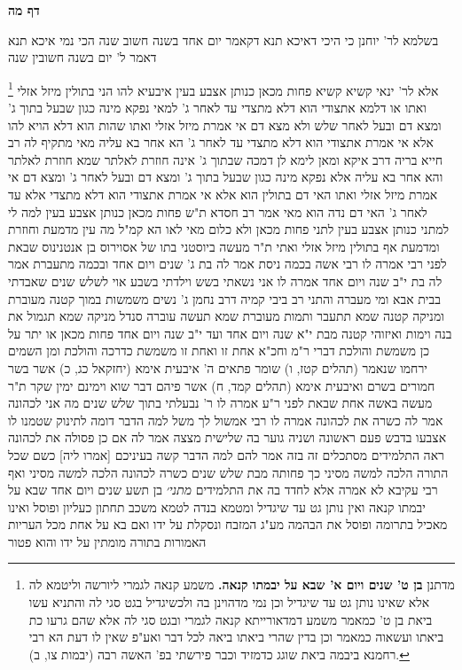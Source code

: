 \documentclass[12pt, openany]{book}
\newcommand{\sethebfont}{
\fontsize{10.5pt}{21.0pt} \selectfont
}
\newcommand{\twocol}[1]{
	{\sethebfont \begin{multicols}{2}
			#1
	\end{multicols}}	
}
\newcommand{\sectname}{}
\newcommand{\newsection}[1]{
	\addcontentsline{toc}{section}{#1}
	\renewcommand{\sectname}{#1}	
	\vspace{-\baselineskip}
	\begin{center}
		\textbf{%
\fontsize{16pt}{16pt}\selectfont
			#1}
	\end{center}
	\vspace{-\baselineskip}
	\nopagebreak
}
\newcommand{\footnotecomment}[1]{
	\renewcommand\thefootnote{}
	\footnote{#1}}
\newcommand{\commenta}[1]{\footnotecomment{#1}}
\begin{document}
\newsection{דף מה}
\twocol{בשלמא לר' יוחנן כי היכי דאיכא תנא דקאמר יום אחד בשנה חשוב שנה הכי נמי איכא תנא דאמר ל' יום בשנה חשובין שנה 
\commenta{מדתנן \textbf{בן ט' שנים ויום א' שבא על יבמתו קנאה.} משמע קנאה לגמרי ליורשה וליטמא לה אלא שאינו נותן גט עד שיגדיל וכן נמי מדהוינן בה ולכשיגדיל בגט סגי לה והתניא עשו ביאת בן ט' כמאמר משמע דמדאורייתא קנאה לגמרי ובגט סגי לה אלא שהם גרעו כת ביאתו ועשאוה כמאמר וכן בדין שהרי ביאתו ביאה לכל דבר ואע"פ שאין לו דעת הא רבי רחמנא ביבמה ביאת שוגג כדמזיד וכבר פירשתי בפ' האשה רבה (יבמות צו, ב). }
אלא לר' ינאי קשיא קשיא
פחות מכאן כנותן אצבע בעין איבעיא להו הני בתולין מיזל אזלי ואתו או דלמא אתצודי הוא דלא מתצדי עד לאחר ג' 
למאי נפקא מינה כגון שבעל בתוך ג' ומצא דם ובעל לאחר שלש ולא מצא דם אי אמרת מיזל אזלי ואתו שהות הוא דלא הויא להו
אלא אי אמרת אתצודי הוא דלא מתצדי עד לאחר ג' הא אחר בא עליה מאי 
מתקיף לה רב חייא בריה דרב איקא ומאן לימא לן דמכה שבתוך ג' אינה חוזרת לאלתר שמא חוזרת לאלתר והא אחר בא עליה 
אלא נפקא מינה כגון שבעל בתוך ג' ומצא דם ובעל לאחר ג' ומצא דם אי אמרת מיזל אזלי ואתו האי דם בתולין הוא אלא אי אמרת אתצודי הוא דלא מתצדי אלא עד לאחר ג' האי דם נדה הוא מאי 
אמר רב חסדא ת"ש פחות מכאן כנותן אצבע בעין למה לי למתני כנותן אצבע בעין לתני פחות מכאן ולא כלום מאי לאו הא קמ"ל מה עין מדמעת וחוזרת ומדמעת אף בתולין מיזל אזלי ואתי 
ת"ר מעשה ביוסטני בתו של אסוירוס בן אנטנינוס שבאת לפני רבי אמרה לו רבי אשה בכמה ניסת אמר לה בת ג' שנים ויום אחד 
ובכמה מתעברת אמר לה בת י"ב שנה ויום אחד אמרה לו אני נשאתי בשש וילדתי בשבע אוי לשלש שנים שאבדתי בבית אבא 
ומי מעברה והתני רב ביבי קמיה דרב נחמן ג' נשים משמשות במוך קטנה מעוברת ומניקה 
קטנה שמא תתעבר ותמות מעוברת שמא תעשה עוברה סנדל מניקה שמא תגמול את בנה וימות 
ואיזוהי קטנה מבת י"א שנה ויום אחד ועד י"ב שנה ויום אחד פחות מכאן או יתר על כן משמשת והולכת דברי ר"מ 
וחכ"א אחת זו ואחת זו משמשת כדרכה והולכת ומן השמים ירחמו שנאמר (תהלים קטז, ו) שומר פתאים ה' 
איבעית אימא (יחזקאל כג, כ) אשר בשר חמורים בשרם ואיבעית אימא (תהלים קמד, ח) אשר פיהם דבר שוא וימינם ימין שקר 
ת"ר מעשה באשה אחת שבאת לפני ר"ע אמרה לו ר' נבעלתי בתוך שלש שנים מה אני לכהונה אמר לה כשרה את לכהונה 
אמרה לו רבי אמשול לך משל למה הדבר דומה לתינוק שטמנו לו אצבעו בדבש פעם ראשונה ושניה גוער בה שלישית מצצה אמר לה אם כן פסולה את לכהונה 
ראה התלמידים מסתכלים זה בזה אמר להם למה הדבר קשה בעיניכם [אמרו ליה] כשם שכל התורה הלכה למשה מסיני כך פחותה מבת שלש שנים כשרה לכהונה הלכה למשה מסיני ואף רבי עקיבא לא אמרה אלא לחדד בה את התלמידים
{\large\emph{מתני׳}} בן תשע שנים ויום אחד שבא על יבמתו קנאה ואין נותן גט עד שיגדיל
ומטמא בנדה לטמא משכב תחתון כעליון 
ופוסל ואינו מאכיל בתרומה ופוסל את הבהמה מע"ג המזבח ונסקלת על ידו ואם בא על אחת מכל העריות האמורות בתורה מומתין על ידו והוא פטור
}
\end{document}
